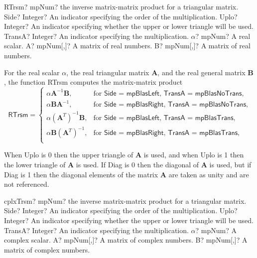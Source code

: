 \begin{mpFunctionsExtract}
	\mpFunctionSix
	{RTrsm? mpNum? the inverse matrix-matrix product for a triangular matrix.}
	{Side? Integer? An indicator specifying the order of the multiplication.}
	{Uplo? Integer? An indicator specifying whether the upper or lower triangle will be used.}
	{TransA? Integer? An indicator specifying the multiplication.}
	{$\alpha$? mpNum? A real scalar.}
	{A? mpNum[,]? A matrix of real numbers.}
	{B? mpNum[,]? A matrix of real numbers.}
\end{mpFunctionsExtract}

\vspace{0.3cm}
For the real scalar $\alpha$, the real triangular matrix $\boldsymbol{A}$, and  the real general matrix $\boldsymbol{B}$, the function \textsf{RTrsm} computes the matrix-matrix product
\begin{equation}
\textsf{RTrsm}=\begin{cases}
\alpha \boldsymbol{A}^{-1} \boldsymbol{B}, & \text{for } \textsf{Side = mpBlasLeft, TransA = mpBlasNoTrans},\\
\alpha \boldsymbol{B} \boldsymbol{A}^{-1}, & \text{for } \textsf{Side = mpBlasRight, TransA = mpBlasNoTrans},\\
\alpha \left(\boldsymbol{A}^T \right)^{-1} \boldsymbol{B}, & \text{for } \textsf{Side = mpBlasLeft, TransA = mpBlasTrans},\\
\alpha \boldsymbol{B} \left(\boldsymbol{A}^T \right)^{-1}, & \text{for } \textsf{Side = mpBlasRight, TransA = mpBlasTrans},\\
\end{cases}
\end{equation}

When \textsf{Uplo} is 0 then the upper triangle of $\boldsymbol{A}$ is used, and when \textsf{Uplo} is 1 then the lower triangle of $\boldsymbol{A}$ is used. If \textsf{Diag} is 0 then the diagonal of $\boldsymbol{A}$ is used, but if \textsf{Diag} is 1 then the diagonal elements of the matrix $\boldsymbol{A}$ are taken as unity and are not referenced. 



\vspace{0.6cm}
\begin{mpFunctionsExtract}
	\mpFunctionSix
	{cplxTrsm? mpNum? the inverse matrix-matrix product for a triangular matrix.}
	{Side? Integer? An indicator specifying the order of the multiplication.}
	{Uplo? Integer? An indicator specifying whether the upper or lower triangle will be used.}
	{TransA? Integer? An indicator specifying the multiplication.}
	{$\alpha$? mpNum? A complex scalar.}
	{A? mpNum[,]? A matrix of complex numbers.}
	{B? mpNum[,]? A matrix of complex numbers.}
\end{mpFunctionsExtract}

